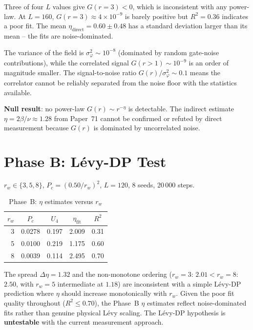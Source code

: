 \documentclass[11pt,a4paper]{article}
\begin{document}
Three of four $L$ values give $G(r{=}3)<0$, which is inconsistent with any
power-law.  At $L{=}160$, $G(r{=}3)\approx4\times10^{-9}$ is barely positive
but $R^2{=}0.36$ indicates a poor fit.  The mean $\eta_\text{direct}=0.60\pm0.48$
has a standard deviation larger than its mean -- the fits are noise-dominated.

The variance of the field is $\sigma_\varphi^2\sim10^{-8}$ (dominated by random
gate-noise contributions), while the correlated signal $G(r>1)\sim10^{-9}$
is an order of magnitude smaller.  The signal-to-noise ratio
$G(r)/\sigma_\varphi^2\sim 0.1$ means the correlator cannot be reliably
separated from the noise floor with the statistics available.

\textbf{Null result}: no power-law $G(r)\sim r^{-\eta}$ is detectable.
The indirect estimate $\eta=2\beta/\nu\approx1.28$ from Paper~71 cannot be
confirmed or refuted by direct measurement because $G(r)$ is dominated by
uncorrelated noise.

\section{Phase B: L\'{e}vy-DP Test}\label{sec:B}

$r_w\in\{3,5,8\}$, $P_c=(0.50/r_w)^2$, $L{=}120$, 8 seeds, 20\,000 steps.

\begin{table}[h]
\centering
\caption{Phase~B: $\eta$ estimates versus $r_w$}
\label{tab:phaseB}
\begin{tabular}{rcccc}
\toprule
$r_w$ & $P_c$ & $U_4$ & $\eta_\text{fit}$ & $R^2$ \\
\midrule
3 & 0.0278 & 0.197 & 2.009 & 0.31 \\
5 & 0.0100 & 0.219 & 1.175 & 0.60 \\
8 & 0.0039 & 0.114 & 2.495 & 0.70 \\
\bottomrule
\end{tabular}
\end{table}

The spread $\Delta\eta=1.32$ and the non-monotone ordering ($r_w{=}3$:
$2.01 < r_w{=}8$: $2.50$, with $r_w{=}5$ intermediate at $1.18$) are inconsistent
with a simple L\'{e}vy-DP prediction where $\eta$ should increase monotonically
with $r_w$.  Given the poor fit quality throughout ($R^2\leq0.70$), the Phase~B
$\eta$ estimates reflect noise-dominated fits rather than genuine physical
L\'{e}vy scaling.  The L\'{e}vy-DP hypothesis is \textbf{untestable} with the
current measurement approach.
\end{document}
